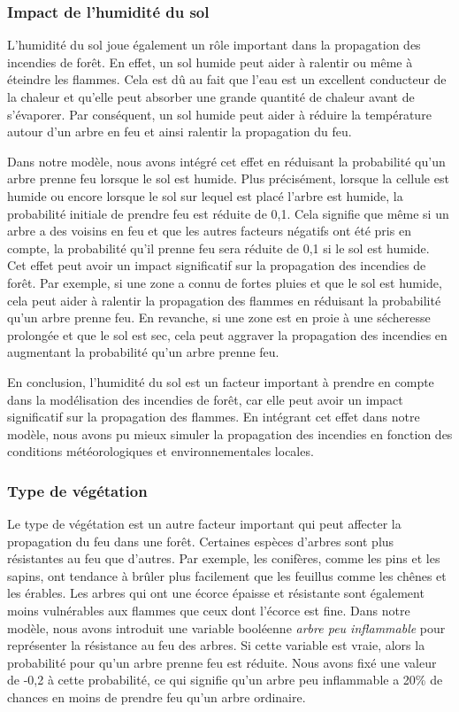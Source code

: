 \subsubsection{Impact de l’humidité du sol}

L'humidité du sol joue également un rôle important dans la propagation des incendies de forêt. En effet, un sol humide peut aider à ralentir ou même à éteindre les flammes. Cela est dû au fait que l'eau est un excellent conducteur de la chaleur et qu'elle peut absorber une grande quantité de chaleur avant de s'évaporer. Par conséquent, un sol humide peut aider à réduire la température autour d'un arbre en feu et ainsi ralentir la propagation du feu.

Dans notre modèle, nous avons intégré cet effet en réduisant la probabilité qu'un arbre prenne feu lorsque le sol est humide. Plus précisément, lorsque la cellule est humide ou encore lorsque le sol sur lequel est placé l’arbre est humide, la probabilité initiale de prendre feu est réduite de 0,1. Cela signifie que même si un arbre a des voisins en feu et que les autres facteurs négatifs ont été pris en compte, la probabilité qu'il prenne feu sera réduite de 0,1 si le sol est humide.
Cet effet peut avoir un impact significatif sur la propagation des incendies de forêt. Par exemple, si une zone a connu de fortes pluies et que le sol est humide, cela peut aider à ralentir la propagation des flammes en réduisant la probabilité qu'un arbre prenne feu. En revanche, si une zone est en proie à une sécheresse prolongée et que le sol est sec, cela peut aggraver la propagation des incendies en augmentant la probabilité qu'un arbre prenne feu.

En conclusion, l'humidité du sol est un facteur important à prendre en compte dans la modélisation des incendies de forêt, car elle peut avoir un impact significatif sur la propagation des flammes. En intégrant cet effet dans notre modèle, nous avons pu mieux simuler la propagation des incendies en fonction des conditions météorologiques et environnementales locales.

\subsubsection{Type de végétation}

Le type de végétation est un autre facteur important qui peut affecter la propagation du feu dans une forêt. Certaines espèces d'arbres sont plus résistantes au feu que d'autres. Par exemple, les conifères, comme les pins et les sapins, ont tendance à brûler plus facilement que les feuillus comme les chênes et les érables. Les arbres qui ont une écorce épaisse et résistante sont également moins vulnérables aux flammes que ceux dont l'écorce est fine. Dans notre modèle, nous avons introduit une variable booléenne \textit{arbre peu inflammable} pour représenter la résistance au feu des arbres. Si cette variable est vraie, alors la probabilité pour qu'un arbre prenne feu est réduite. Nous avons fixé une valeur de -0,2 à cette probabilité, ce qui signifie qu'un arbre peu inflammable a 20\% de chances en moins de prendre feu qu'un arbre ordinaire.

